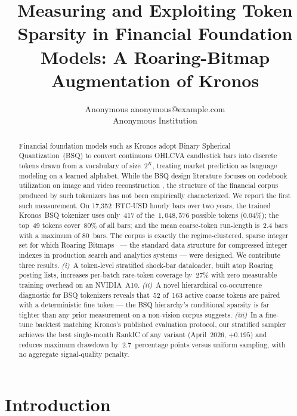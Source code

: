 \documentclass[10pt]{article}
\title{Measuring and Exploiting Token Sparsity in Financial
Foundation Models: A Roaring-Bitmap Augmentation of Kronos}
\author{\name Anonymous \email anonymous@example.com \\
        \addr Anonymous Institution}
\begin{document}
\maketitle

\begin{abstract}
Financial foundation models such as Kronos
\citep{kronos2025} adopt Binary Spherical Quantization~(BSQ)
\citep{bsq2024} to convert continuous OHLCVA candlestick bars into
discrete tokens drawn from a vocabulary of size~$2^{K}$, treating
market prediction as language modeling on a learned alphabet. While
the BSQ design literature focuses on codebook utilization on image and
video reconstruction
\citep{fsq2024, lfq2024, shrinks_codebook2026}, the structure of the
financial corpus produced by such tokenizers has not been empirically
characterized. We report the first such measurement. On
17{,}352~BTC-USD hourly bars over two years, the trained
Kronos~BSQ tokenizer uses only~417 of the~$1{,}048{,}576$ possible
tokens (0.04\%); the top~49 tokens cover~80\% of all bars; and the
mean coarse-token run-length is~2.4 bars with a maximum of 80~bars.
The corpus is exactly the regime-clustered, sparse integer set for
which Roaring Bitmaps~\citep{roaring2016} --- the standard data
structure for compressed integer indexes in production search and
analytics systems --- were designed.
We contribute three results.
\emph{(i)}~A token-level stratified shock-bar dataloader, built atop
Roaring posting lists, increases per-batch rare-token coverage
by~27\% with zero measurable training overhead on an
NVIDIA~A10. \emph{(ii)}~A novel hierarchical co-occurrence diagnostic
for BSQ tokenizers reveals that~52 of~163 active coarse tokens are
paired with a deterministic fine token --- the BSQ hierarchy's
conditional sparsity is far tighter than any prior measurement on a
non-vision corpus suggests. \emph{(iii)}~In a fine-tune backtest
matching Kronos's published evaluation protocol, our stratified
sampler achieves the best single-month RankIC of any variant
(April~2026, $+0.195$) and reduces maximum drawdown by~2.7~percentage
points versus uniform sampling, with no aggregate signal-quality
penalty.
\end{abstract}

\section{Introduction}
\end{document}
